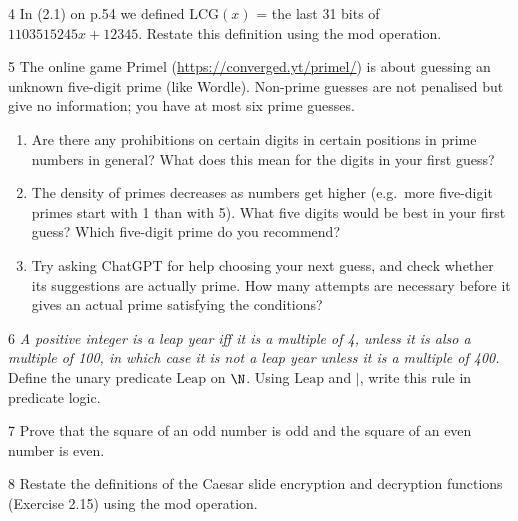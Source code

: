 \begin{exercise}{4}
    In (2.1) on p.54 we defined
    $\mathrm{LCG}(x)$ = the last 31 bits of $1103515245x+12345$. Restate this
    definition using the mod operation.
\end{exercise}

\begin{exercise}{5}
    The online game Primel (\url{https://converged.yt/primel/}) is about
    guessing an unknown five-digit prime (like Wordle). Non-prime guesses are not
    penalised but give no information; you have at most six prime guesses.
    \begin{enumerate}[label=(\alph*)]
        \item Are there any prohibitions on certain digits in certain positions
              in prime numbers in general? What does this mean for the digits in
              your first guess?
        \item The density of primes decreases as numbers get higher (e.g.\ more
              five-digit primes start with 1 than with 5). What five digits
              would be best in your first guess? Which five-digit prime do you
              recommend?
        \item Try asking ChatGPT for help choosing your next guess, and check
              whether its suggestions are actually prime. How many attempts are
              necessary before it gives an actual prime satisfying the conditions?
    \end{enumerate}
\end{exercise}

\begin{exercise}{6}
    \emph{A positive integer is a leap year iff it is a multiple of 4, unless it
    is also a multiple of 100, in which case it is not a leap year unless it is a
    multiple of 400.} Define the unary predicate $\mathrm{Leap}$ on $\N$. Using
    $\mathrm{Leap}$ and $\mid$, write this rule in predicate logic.
\end{exercise}

\begin{exercise}{7}
    Prove that the square of an odd number is odd and the square of an even
    number is even.
\end{exercise}

\begin{exercise}{8}
    Restate the definitions of the Caesar slide encryption and decryption
    functions (Exercise 2.15) using the mod operation.
\end{exercise}

